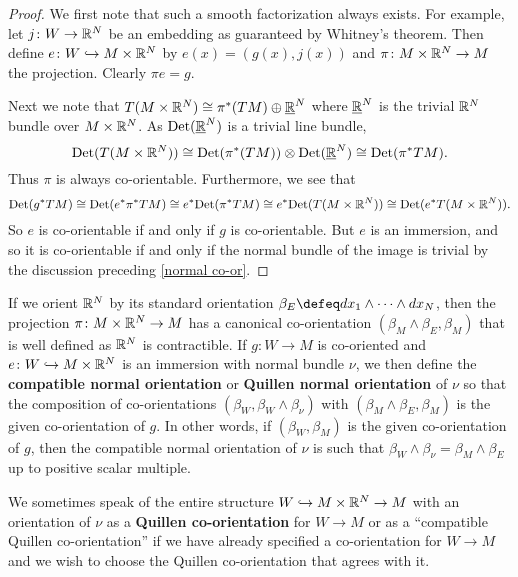 \begin{proof}
	We first note that such a smooth factorization always exists.
	For example, let $j \colon W \to \mathbb{R}^N$ be an embedding as guaranteed by Whitney's theorem.
	Then define $e \colon W \hookrightarrow M \times \mathbb{R}^N$ by $e(x) = (g(x),j(x))$ and $\pi \colon M \times \mathbb{R}^N \to M$ the projection.
	Clearly $\pi e = g$.

	Next we note that $T(M \times \mathbb{R}^N) \cong \pi^*(TM) \oplus \underline{\mathbb{R}}^N$ where $\underline{\mathbb{R}}^N$ is the trivial $\mathbb{R}^N$ bundle over $M \times \mathbb{R}^N$.
	As ${\rm Det}( \underline{\mathbb{R}}^N)$ is a trivial line bundle,
	\begin{equation*}
		{\rm Det}(T(M \times \mathbb{R}^N)) \cong {\rm Det}(\pi^*(TM)) \otimes {\rm Det}(\underline{\mathbb{R}}^N) \cong {\rm Det}(\pi^*TM).
	\end{equation*}
	Thus $\pi$ is always co-orientable.
	Furthermore, we see that
	\begin{equation*}
		{\rm Det}(g^*TM) \cong {\rm Det}(e^*\pi^*TM) \cong e^*{\rm Det}(\pi^*TM) \cong e^*{\rm Det}(T(M \times \mathbb{R}^N)) \cong {\rm Det}(e^*T(M \times \mathbb{R}^N)).
	\end{equation*}
	So $e$ is co-orientable if and only if $g$ is co-orientable.
	But $e$ is an immersion, and so it is co-orientable if and only if the normal bundle of the image is trivial by the discussion preceding \cref{normal co-or}.
\end{proof}

\begin{definition}\label{D: Quillen normal or}
	If we orient $\mathbb{R}^N$ by its standard orientation $\beta_E \defeq dx_1 \wedge\cdots\wedge dx_N$, then the projection $\pi \colon M \times \mathbb{R}^N \to M$ has a canonical co-orientation $(\beta_M \wedge \beta_E, \beta_M)$ that is well defined as $\mathbb{R}^N$ is contractible.
	If $g \colon W \to M$ is co-oriented and $e \colon W \hookrightarrow M \times \mathbb{R}^N$ is an immersion with normal bundle $\nu$, we then define the \textbf{compatible normal orientation} or \textbf{Quillen normal orientation} of $\nu$ so that the composition of co-orientations $(\beta_W,\beta_W \wedge \beta_\nu)$ with $(\beta_M \wedge \beta_E,\beta_M)$ is the given co-orientation of $g$.
	In other words, if $(\beta_W,\beta_M)$ is the given co-orientation of $g$, then the compatible normal orientation of $\nu$ is such that $\beta_W \wedge \beta_\nu = \beta_M \wedge \beta_E$ up to positive scalar multiple.

	We sometimes speak of the entire structure $W \hookrightarrow M \times \mathbb{R}^N \to M$ with an orientation of $\nu$ as a \textbf{Quillen co-orientation} for $W \to M$ or as a ``compatible Quillen co-orientation'' if we have already specified a co-orientation for $W \to M$ and we wish to choose the Quillen co-orientation that agrees with it.
\end{definition}

